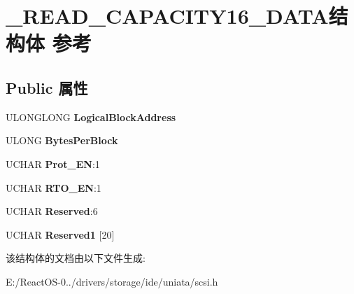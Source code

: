 \hypertarget{struct___r_e_a_d___c_a_p_a_c_i_t_y16___d_a_t_a}{}\section{\+\_\+\+R\+E\+A\+D\+\_\+\+C\+A\+P\+A\+C\+I\+T\+Y16\+\_\+\+D\+A\+T\+A结构体 参考}
\label{struct___r_e_a_d___c_a_p_a_c_i_t_y16___d_a_t_a}
\subsection*{Public 属性}
\begin{DoxyCompactItemize}
\item 
\mbox{\label{struct___r_e_a_d___c_a_p_a_c_i_t_y16___d_a_t_a_a75bcee5ec3329b7b3c49275f1e1152e5}} 
U\+L\+O\+N\+G\+L\+O\+NG {\bfseries Logical\+Block\+Address}
\item 
\mbox{\label{struct___r_e_a_d___c_a_p_a_c_i_t_y16___d_a_t_a_ab4fc775e88b247a986594318a9b7a314}} 
U\+L\+O\+NG {\bfseries Bytes\+Per\+Block}
\item 
\mbox{\label{struct___r_e_a_d___c_a_p_a_c_i_t_y16___d_a_t_a_a95fb6b1ff3afd71129844c35609d21fd}} 
U\+C\+H\+AR {\bfseries Prot\+\_\+\+EN}\+:1
\item 
\mbox{\label{struct___r_e_a_d___c_a_p_a_c_i_t_y16___d_a_t_a_ae530afa5175dfcf2c1c8a70d2ec2c62f}} 
U\+C\+H\+AR {\bfseries R\+T\+O\+\_\+\+EN}\+:1
\item 
\mbox{\label{struct___r_e_a_d___c_a_p_a_c_i_t_y16___d_a_t_a_a68d9b95417447dfca5612b3b9a0d5023}} 
U\+C\+H\+AR {\bfseries Reserved}\+:6
\item 
\mbox{\label{struct___r_e_a_d___c_a_p_a_c_i_t_y16___d_a_t_a_abb713745024f2fcf88a319572f8c0221}} 
U\+C\+H\+AR {\bfseries Reserved1} \mbox{[}20\mbox{]}
\end{DoxyCompactItemize}


该结构体的文档由以下文件生成\+:\begin{DoxyCompactItemize}
\item 
E\+:/\+React\+O\+S-\/0../drivers/storage/ide/uniata/scsi.\+h\end{DoxyCompactItemize}
